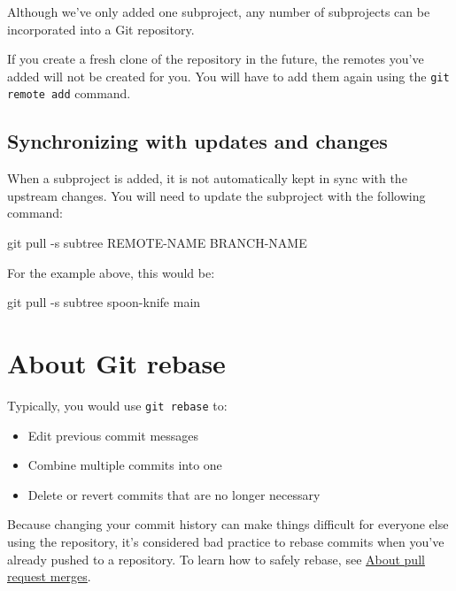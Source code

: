 Although we've only added one subproject, any number of subprojects can be incorporated into a Git repository.

\begin{tipsblock}
If you create a fresh clone of the repository in the future, the remotes you've added will not be created for you. You will have to add them again using the \texttt{git remote add} command.
\end{tipsblock}

\subsection{Synchronizing with updates and changes}

When a subproject is added, it is not automatically kept in sync with the upstream changes. You will need to update the subproject with the following command:
\begin{codeblock}[language=bash]
git pull -s subtree REMOTE-NAME BRANCH-NAME 
\end{codeblock}

For the example above, this would be:
\begin{codeblock}[language=bash]
git pull -s subtree spoon-knife main 
\end{codeblock}


\newpage 
\section{About Git rebase}

Typically, you would use \texttt{git rebase} to:
\begin{itemize}
    \item Edit previous commit messages
    \item Combine multiple commits into one
    \item Delete or revert commits that are no longer necessary
\end{itemize}

\begin{warningblock}
    Because changing your commit history can make things difficult for everyone else using the repository, it's considered bad practice to rebase commits when you've already pushed to a repository. To learn how to safely rebase, see \href{https://docs.github.com/en/pull-requests/collaborating-with-pull-requests/incorporating-changes-from-a-pull-request/about-pull-request-merges}{About pull request merges}.
\end{warningblock}

